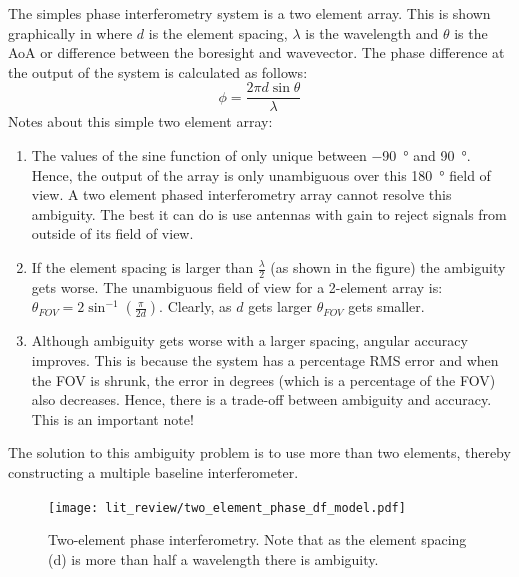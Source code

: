 The simples phase interferometry system is a two element array. This is shown graphically in  where \(d\) is the element spacing, \(\lambda\) is the wavelength and \(\theta\) is the AoA or difference between the boresight and wavevector.
The phase difference at the output of the system is calculated as follows:
\begin{equation}
\phi = \frac{2 \pi d \sin \theta}{\lambda}
\end{equation}
Notes about this simple two element array:
\begin{enumerate}
  \item The values of the sine function of only unique between \SI{-90}{\degree} and \SI{90}{\degree}. Hence, the output of the array is only unambiguous over this \SI{180}{\degree} field of view. A two element phased interferometry array cannot resolve this ambiguity. The best it can do is use antennas with gain to reject signals from outside of its field of view.
  \item If the element spacing is larger than \(\frac{\lambda}{2}\) (as shown in the figure) the ambiguity gets worse. The unambiguous field of view for a 2-element array is: \(\theta_{FOV} = 2 \sin^{-1}(\frac{\pi}{2d})\). Clearly, as \(d\) gets larger \(\theta_{FOV}\) gets smaller. 
  \item Although ambiguity gets worse with a larger spacing, angular accuracy improves. This is because the system has a percentage RMS error and when the FOV is shrunk, the error in degrees (which is a percentage of the FOV) also decreases. Hence, there is a trade-off between ambiguity and accuracy. This is an important note!
 \end{enumerate}
 The solution to this ambiguity problem is to use more than two elements, thereby constructing a multiple baseline interferometer. 

\begin{figure}
   \centering
   \texttt{[image: lit\_review/two\_element\_phase\_df\_model.pdf]}
   \caption{Two-element phase interferometry. Note that as the element spacing (d) is more than half a wavelength there is ambiguity.}
   \label{fig:lit-two-element-phase}
\end{figure}

